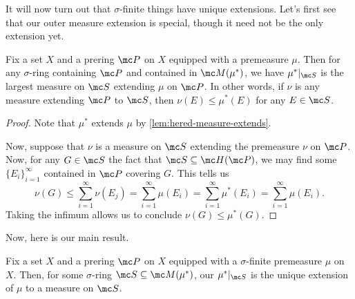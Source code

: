 \documentclass[../notes.tex]{subfiles}
\begin{document}
It will now turn out that $\sigma$-finite things have unique extensions. Let's first see that our outer measure extension is special, though it need not be the only extension yet.
\begin{lemma} \label{lem:outer-is-largest}
	Fix a set $X$ and a prering $\mc P$ on $X$ equipped with a premeasure $\mu$. Then for any $\sigma$-ring containing $\mc P$ and contained in $\mc M(\mu^*)$, we have $\mu^*|_{\mc S}$ is the largest measure on $\mc S$ extending $\mu$ on $\mc P$. In other words, if $\nu$ is any measure extending $\mc P$ to $\mc S$, then $\nu(E)\le\mu^*(E)$ for any $E\in\mc S$.
\end{lemma}
\begin{proof}
	Note that $\mu^*$ extends $\mu$ by \autoref{lem:hered-measure-extends}.
	
	Now, suppose that $\nu$ is a measure on $\mc S$ extending the premeasure $\nu$ on $\mc P$. Now, for any $G\in\mc S$ the fact that $\mc S\subseteq\mc H(\mc P)$, we may find some $\{E_i\}_{i=1}^\infty$ contained in $\mc P$ covering $G$. This tells us
	\[\nu(G)\le\sum_{i=1}^\infty\nu(E_j)=\sum_{i=1}^\infty\mu(E_i)=\sum_{i=1}^\infty\mu^*(E_i)=\sum_{i=1}^\infty\mu(E_i).\]
	Taking the infimum allows us to conclude $\nu(G)\le\mu^*(G)$.
\end{proof}
Now, here is our main result.
\begin{theorem} \label{thm:measure-extension-unique}
	Fix a set $X$ and a prering $\mc P$ on $X$ equipped with a $\sigma$-finite premeasure $\mu$ on $X$. Then, for some $\sigma$-ring $\mc S\subseteq\mc M(\mu^*)$, our $\mu^*|_{\mc S}$ is the unique extension of $\mu$ to a measure on $\mc S$.
\end{theorem}
\end{document}
